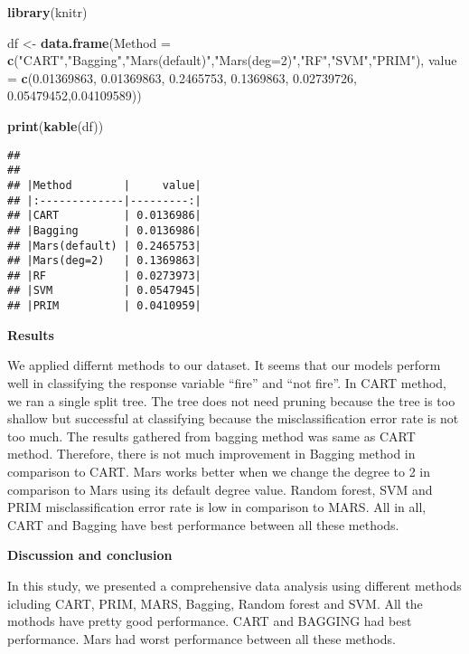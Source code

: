 \documentclass[
]{article}
\newenvironment{Shaded}{\begin{snugshade}}{\end{snugshade}}
\newcommand{\DataTypeTok}[1]{\textcolor[rgb]{0.13,0.29,0.53}{#1}}
\newcommand{\FloatTok}[1]{\textcolor[rgb]{0.00,0.00,0.81}{#1}}
\newcommand{\KeywordTok}[1]{\textcolor[rgb]{0.13,0.29,0.53}{\textbf{#1}}}
\newcommand{\NormalTok}[1]{#1}
\newcommand{\StringTok}[1]{\textcolor[rgb]{0.31,0.60,0.02}{#1}}
\begin{document}
\begin{Shaded}
\begin{Highlighting}[]
\KeywordTok{library}\NormalTok{(knitr)}

\NormalTok{df <-}\StringTok{ }\KeywordTok{data.frame}\NormalTok{(}\DataTypeTok{Method =} \KeywordTok{c}\NormalTok{(}\StringTok{"CART"}\NormalTok{,}\StringTok{"Bagging"}\NormalTok{,}\StringTok{"Mars(default)"}\NormalTok{,}\StringTok{"Mars(deg=2)"}\NormalTok{,}\StringTok{"RF"}\NormalTok{,}\StringTok{"SVM"}\NormalTok{,}\StringTok{"PRIM"}\NormalTok{),}
                 \DataTypeTok{value =} \KeywordTok{c}\NormalTok{(}\FloatTok{0.01369863}\NormalTok{, }\FloatTok{0.01369863}\NormalTok{, }\FloatTok{0.2465753}\NormalTok{, }\FloatTok{0.1369863}\NormalTok{, }\FloatTok{0.02739726}\NormalTok{,}
                           \FloatTok{0.05479452}\NormalTok{,}\FloatTok{0.04109589}\NormalTok{))}

\KeywordTok{print}\NormalTok{(}\KeywordTok{kable}\NormalTok{(df))}
\end{Highlighting}
\end{Shaded}

\begin{verbatim}
## 
## 
## |Method        |     value|
## |:-------------|---------:|
## |CART          | 0.0136986|
## |Bagging       | 0.0136986|
## |Mars(default) | 0.2465753|
## |Mars(deg=2)   | 0.1369863|
## |RF            | 0.0273973|
## |SVM           | 0.0547945|
## |PRIM          | 0.0410959|
\end{verbatim}

\textbf{Results}

We applied differnt methods to our dataset. It seems that our models
perform well in classifying the response variable ``fire'' and ``not
fire''. In CART method, we ran a single split tree. The tree does not
need pruning because the tree is too shallow but successful at
classifying because the misclassification error rate is not too much.
The results gathered from bagging method was same as CART method.
Therefore, there is not much improvement in Bagging method in comparison
to CART. Mars works better when we change the degree to 2 in comparison
to Mars using its default degree value. Random forest, SVM and PRIM
misclassification error rate is low in comparison to MARS. All in all,
CART and Bagging have best performance between all these methods.

\textbf{Discussion and conclusion}

In this study, we presented a comprehensive data analysis using
different methods icluding CART, PRIM, MARS, Bagging, Random forest and
SVM. All the mothods have pretty good performance. CART and BAGGING had
best performance. Mars had worst performance between all these methods.
\end{document}
